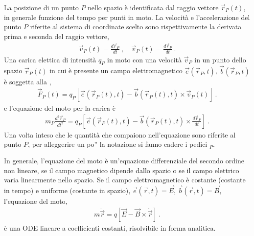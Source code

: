 \documentclass[letterpaper,10pt,italian]{jupyterBook}
\begin{document}
\sphinxAtStartPar
La posizione di un punto \(P\) nello spazio è identificata dal raggio vettore \(\vec{r}_P(t)\), in generale funzione del tempo per punti in moto. La velocità e l’accelerazione del punto \(P\) riferite al sistema di coordinate scelto sono rispettivamente la derivata prima e seconda del raggio vettore,
\begin{equation*}
\begin{split}\vec{v}_P(t) = \frac{d \vec{r}_P}{d t} \ , \quad
  \vec{v}_P(t) = \frac{d \vec{r}_P}{d t} \ .\end{split}
\end{equation*}
\sphinxAtStartPar
Una carica elettica di intensità \(q_P\) in moto con una velocità \(\vec{v}_P\) in un punto dello spazio \(\vec{r}_P(t)\) in cui è presente un campo elettromagnetico \(\vec{e}(\vec{r}_P,t)\), \(\vec{b}(\vec{r}_P,t)\) è soggetta alla {\hyperref[\detokenize{ch/electromagnetism/electromagnetism-steady:physics-hs-electromagnetism-lorentz}]{}},
\begin{equation*}
\begin{split}\vec{F}_P(t) = q_P \left[ \vec{e}(\vec{r}_P(t),t) - \vec{b}(\vec{r}_P(t),t) \times \vec{v}_P(t) \right] \ .\end{split}
\end{equation*}
\sphinxAtStartPar
e l’equazione del moto per la carica è
\begin{equation*}
\begin{split}m_P \frac{ d^2 \vec{r}_P}{dt^2} = q_P \left[ \vec{e}(\vec{r}_P(t),t) - \vec{b}(\vec{r}_P(t),t) \times \frac{d \vec{r}_P}{dt} \right] \ .\end{split}
\end{equation*}
\sphinxAtStartPar
Una volta inteso che le quantità che compaiono nell’equazione sono riferite al punto \(P\), per alleggerire un po” la notazione si fanno cadere i pedici \(_P\).

\sphinxAtStartPar
In generale, l’equazione del moto è un’equazione differenziale del secondo ordine non lineare, se il campo magnetico dipende dallo spazio o se il campo elettrico varia linearmente nello spazio. Se il campo elettromagnetico è costante (costante in tempo) e uniforme (costante in spazio), \(\vec{e}(\vec{r},t) = \vec{E}\), \(\vec{b}(\vec{r},t) = \vec{B}\), l’equazione del moto,
\begin{equation*}
\begin{split}m \ddot{\vec{r}} = q \left[ \vec{E} - \vec{B} \times \dot{\vec{r}} \right] \ .\end{split}
\end{equation*}
\sphinxAtStartPar
è una ODE lineare a coefficienti costanti, risolvibile in forma analitica.
\end{document}

